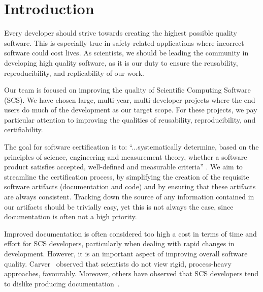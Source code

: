 \documentclass[sigconf]{acmart}
\begin{document}

\maketitle

\section{Introduction} \label{SecIntroduction}

Every developer should strive towards creating the highest possible quality 
software. This is especially true in safety-related applications where 
incorrect software could cost lives. As scientists, we should be leading the 
community in developing high quality software, as it is our duty to ensure the 
reusability, reproducibility, and replicability of our work.

Our team is focused on improving the quality of Scientific Computing Software (SCS).
We have chosen large, multi-year, multi-developer projects where the end users
do much of the development as our target scope. For these projects, we pay
particular attention to improving the qualities of reusability, reproducibility,
and certifiability. 

The goal for software certification is to: ``...systematically determine, based
on the principles of science, engineering and measurement theory, whether a
software product satisfies accepted, well-defined and measurable criteria''
\cite[p.~12]{HatcliffEtAl2009}.  We aim to streamline the certification process,
by simplifying the creation of the requisite software artifacts (documentation
and code) and by ensuring that these artifacts are always consistent. Tracking
down the source of any information contained in our artifacts should be
trivially easy, yet this is not always the case, since documentation is often
not a high priority.

Improved documentation is often considered too high a cost in terms of time and 
effort for SCS developers, particularly when dealing with rapid changes in 
development. However, it is an important aspect of improving overall software 
quality. Carver~\cite{CarverEtAl2007} observed that scientists do not view 
rigid, process-heavy approaches, favourably. Moreover, others have observed that
SCS developers tend to dislike producing documentation~\cite[p.~373]{Roache1998}.
\end{document}
